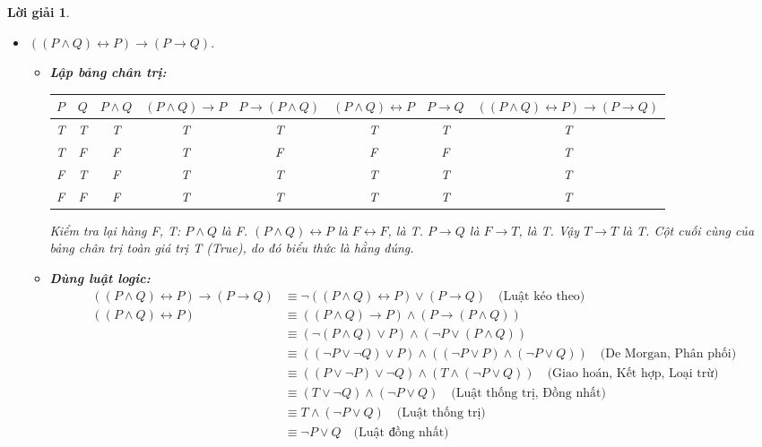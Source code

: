 \documentclass[11pt, oneside, a4paper]{article}
\newtheorem{loigiai}{Lời giải}[bt]
\begin{document}
\begin{loigiai}
\begin{itemize}
      \item[e)] $((P \land Q) \leftrightarrow P) \rightarrow (P \rightarrow Q).$
        \begin{itemize}
            \item \textbf{Lập bảng chân trị:}
            \begin{center}
            \tiny %
            \begin{tabular}{|c|c|c|c|c|c|c|c|}
            \hline
            $P$ & $Q$ & $P \land Q$ & $(P \land Q) \rightarrow P$ & $P \rightarrow (P \land Q)$ & $(P \land Q) \leftrightarrow P$ & $P \rightarrow Q$ & $((P \land Q) \leftrightarrow P) \rightarrow (P \rightarrow Q)$ \\
            \hline
            T & T & T & T & T & T & T & T \\
            T & F & F & T & F & F & F & T \\
            F & T & F & T & T & T & T & T \\ %
            F & F & F & T & T & T & T & T \\ %
            \hline
            \end{tabular}
            \end{center}
            Kiểm tra lại hàng F, T: $P \land Q$ là F. $(P \land Q) \leftrightarrow P$ là $F \leftrightarrow F$, là T. $P \rightarrow Q$ là $F \rightarrow T$, là T. Vậy $T \rightarrow T$ là T.
            Cột cuối cùng của bảng chân trị toàn giá trị T (True), do đó biểu thức là hằng đúng.
            \item \textbf{Dùng luật logic:}
            \begin{align*} ((P \land Q) \leftrightarrow P) \rightarrow (P \rightarrow Q) &\equiv \lnot ((P \land Q) \leftrightarrow P) \lor (P \rightarrow Q) \quad \text{(Luật kéo theo)} \\ ((P \land Q) \leftrightarrow P) &\equiv ((P \land Q) \rightarrow P) \land (P \rightarrow (P \land Q)) \\ &\equiv (\lnot(P \land Q) \lor P) \land (\lnot P \lor (P \land Q)) \\ &\equiv ((\lnot P \lor \lnot Q) \lor P) \land ((\lnot P \lor P) \land (\lnot P \lor Q)) \quad \text{(De Morgan, Phân phối)} \\ &\equiv ( (P \lor \lnot P) \lor \lnot Q) \land (T \land (\lnot P \lor Q)) \quad \text{(Giao hoán, Kết hợp, Loại trừ)} \\ &\equiv (T \lor \lnot Q) \land (\lnot P \lor Q) \quad \text{(Luật thống trị, Đồng nhất)} \\ &\equiv T \land (\lnot P \lor Q) \quad \text{(Luật thống trị)} \\ &\equiv \lnot P \lor Q \quad \text{(Luật đồng nhất)} \end{align*}

\end{itemize}
\end{itemize}
\end{loigiai}
\end{document}
